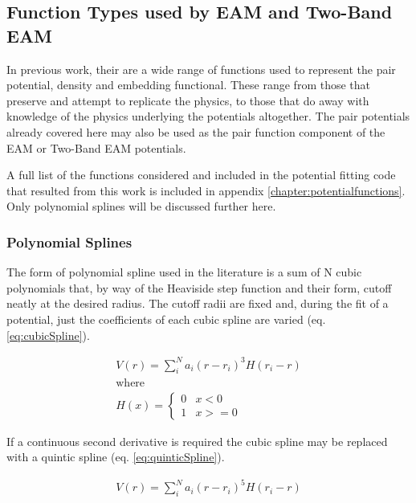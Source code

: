 \subsection{Function Types used by EAM and Two-Band EAM}

In previous work, their are a wide range of functions used to represent the pair potential, density and embedding functional.  These range from those that preserve and attempt to replicate the physics, to those that do away with knowledge of the physics underlying the potentials altogether.  The pair potentials already covered here may also be used as the pair function component of the EAM or Two-Band EAM potentials.

A full list of the functions considered and included in the potential fitting code that resulted from this work is included in appendix \ref{chapter:potentialfunctions}.  Only polynomial splines will be discussed further here.



\subsubsection{Polynomial Splines}
\label{section:backgroundpolynomialsplines}

The form of polynomial spline used in the literature is a sum of N cubic polynomials that, by way of the Heaviside step function and their form, cutoff neatly at the desired radius.  The cutoff radii are fixed and, during the fit of a potential, just the coefficients of each cubic spline are varied (eq. \ref{eq:cubicSpline}).

\begin{equation}
\begin{split}
V(r) = \sum_i^N a_i (r - r_i)^3 H(r_i - r) \\
\text{where } \\
H(x) = \left\{ \begin{matrix} 0 & x<0 \\  1 & x >= 0 \end{matrix} \right . 
\end{split}
\label{eq:cubicSpline}
\end{equation}

If a continuous second derivative is required the cubic spline may be replaced with a quintic spline (eq. \ref{eq:quinticSpline}).

\begin{equation}
\begin{split}
V(r) = \sum_i^N a_i (r - r_i)^5 H(r_i - r) \\
\end{split}
\label{eq:quinticSpline}
\end{equation}


